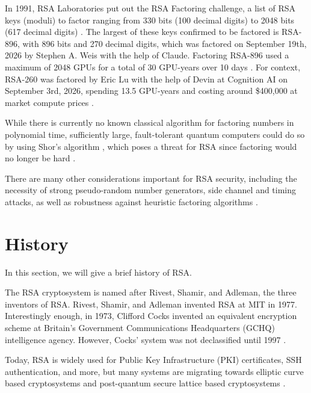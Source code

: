 \documentclass[12pt, letterpaper]{article}
\theoremstyle{definition}
\begin{document}
In 1991, RSA Laboratories put out the RSA Factoring challenge, a list of RSA keys (moduli)
to factor ranging from 330 bits (100 decimal digits) to 2048 bits (617 decimal digits)
\cite{rsa_challenge}.
The largest of these keys confirmed to be factored is RSA-896, with 896 bits and
270 decimal digits, which was factored on September 19th, 2026 by Stephen A. Weis with the
help of Claude. Factoring RSA-896 used a maximum of 2048 GPUs for a total of
30 GPU-years over 10 days \cite{rsa_896}.
For context, RSA-260 was factored by Eric Lu with the help of Devin at Cognition AI on
September 3rd, 2026, spending 13.5 GPU-years and costing around \$400,000 at market compute prices
\cite{rsa_260}.

While there is currently no known classical algorithm for factoring numbers in polynomial time,
sufficiently large, fault-tolerant quantum computers could do so by using Shor's algorithm \cite{shor}, which poses a threat
for RSA since factoring would no longer be hard \cite{rsa}.

There are many other considerations important for RSA security, including
the necessity of strong pseudo-random number generators, side channel and timing attacks,
as well as robustness against heuristic factoring algorithms \cite{rsa}.


\section{History} \label{sec_history}
In this section, we will give a brief history of RSA.

The RSA cryptosystem is named after Rivest, Shamir, and Adleman, the three inventors of RSA.
Rivest, Shamir, and Adleman invented RSA at MIT in 1977. Interestingly enough, in 1973,
Clifford Cocks invented an equivalent encryption scheme at Britain's Government Communications
Headquarters (GCHQ) intelligence agency. However, Cocks' system was not declassified until 1997
\cite{rsa}.

Today, RSA is widely used for Public Key Infrastructure (PKI) certificates, SSH authentication,
and more, but many systems are migrating towards elliptic curve based cryptosystems
\cite{elliptic_curve} and post-quantum secure lattice based cryptosystems \cite{lattice}.


\clearpage
\newpage



% 
\end{document}
